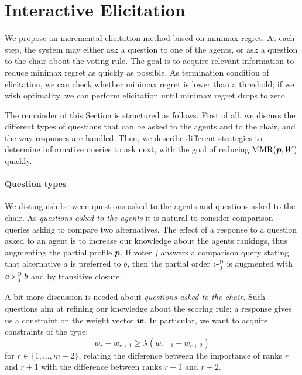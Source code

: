 \section{Interactive Elicitation} 
\label{sec:elicit}
We propose an incremental elicitation method based on minimax regret.
At each step, the system may either ask a question to one of the agents, or ask a question to the chair about the voting rule. 
The goal is to acquire relevant information to reduce minimax regret as quickly as possible.
As termination condition of elicitation, we can check whether minimax regret is lower than a threshold; if we wish optimality, we can perform elicitation until minimax regret drops to zero.

The remainder of this Section is structured as follows.
First of all, we discuss the different types of questions that can be asked to the agents and to the chair, and the way responses are handled.
Then, we describe different strategies to determine informative queries to ask next, with the goal of reducing $\operatorname{MMR}({\bm{p}},W)$ quickly.

\paragraph{Question types}
We distinguish between questions asked to the agents and questions asked to the chair.
As {\em questions asked to the agents} it is natural to consider comparison queries asking to compare two alternatives.
The effect of a response to a question asked to an agent is to increase our knowledge about the agents rankings, thus augmenting the partial profile ${\bm{p}}$. 
If voter $j$ answers a comparison query stating that alternative $a$ is preferred to $b$, then the partial order $\succ^\text{p}_j$ is augmented with $a \succ^\text{p}_j b$ and by transitive closure.

A bit more discussion is needed about {\em questions asked to the chair}.
Such questions aim at refining our knowledge about the scoring rule; a response gives us a constraint on the weight vector $\bm{w}$.
In particular, we want to acquire constraints of the type:
\[ w_{r} - w_{r+1} \geq \lambda (w_{r+1} - w_{r+2}) \] 
for $r \in \{1,\ldots,m-2\}$, relating the difference between the importance of ranks $r$ and $r+1$ with the difference between ranks $r+1$ and $r+2$.

